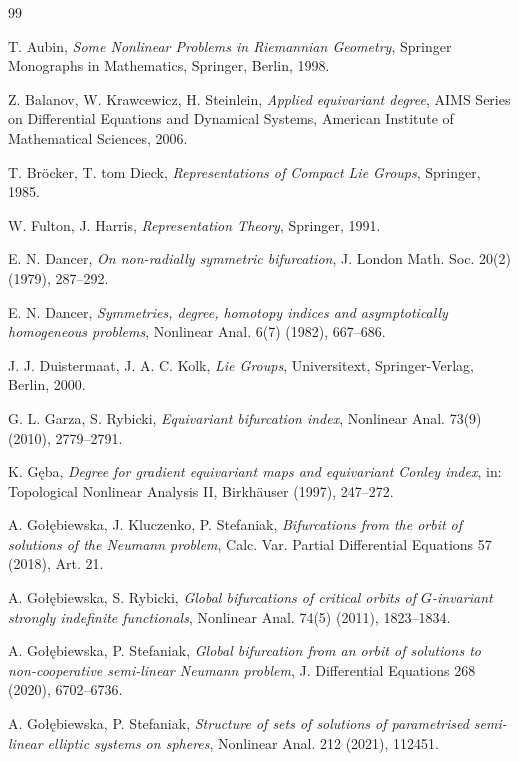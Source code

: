 \documentclass[reqno,twoside,12pt]{amsart}
\numberwithin{equation}{section} \errorcontextlines=0
\begin{document}
\begin{thebibliography}{99}

 T. Aubin, \emph{Some Nonlinear Problems in Riemannian Geometry}, Springer Monographs in Mathematics, Springer, Berlin, 1998.

 Z. Balanov, W. Krawcewicz, H. Steinlein, \emph{Applied equivariant degree}, AIMS Series on Differential Equations and Dynamical Systems, American Institute of Mathematical Sciences, 2006.

 T. Bröcker, T. tom Dieck, \emph{Representations of Compact Lie Groups}, Springer, 1985.

 W. Fulton, J. Harris, \emph{Representation Theory}, Springer, 1991.

 E. N. Dancer, \emph{On non-radially symmetric bifurcation}, J. London Math. Soc. 20(2) (1979), 287--292.

 E. N. Dancer, \emph{Symmetries, degree, homotopy indices and asymptotically homogeneous problems}, Nonlinear Anal. 6(7) (1982), 667--686.

 J. J. Duistermaat, J. A. C. Kolk, \emph{Lie Groups}, Universitext, Springer-Verlag, Berlin, 2000.

 G. L. Garza, S. Rybicki, \emph{Equivariant bifurcation index}, Nonlinear Anal. 73(9) (2010), 2779--2791.

 K. Gęba, \emph{Degree for gradient equivariant maps and equivariant Conley index}, in: Topological Nonlinear Analysis II, Birkhäuser (1997), 247--272.

 A. Gołębiewska, J. Kluczenko, P. Stefaniak, \emph{Bifurcations from the orbit of solutions of the Neumann problem}, Calc. Var. Partial Differential Equations 57 (2018), Art. 21.

 A. Gołębiewska, S. Rybicki, \emph{Global bifurcations of critical orbits of $G$-invariant strongly indefinite functionals}, Nonlinear Anal. 74(5) (2011), 1823--1834.

 A. Gołębiewska, P. Stefaniak, \emph{Global bifurcation from an orbit of solutions to non-cooperative semi-linear Neumann problem}, J. Differential Equations 268 (2020), 6702--6736.

 A. Gołębiewska, P. Stefaniak, \emph{Structure of sets of solutions of parametrised semi-linear elliptic systems on spheres}, Nonlinear Anal. 212 (2021), 112451.


\end{thebibliography}
\end{document}
